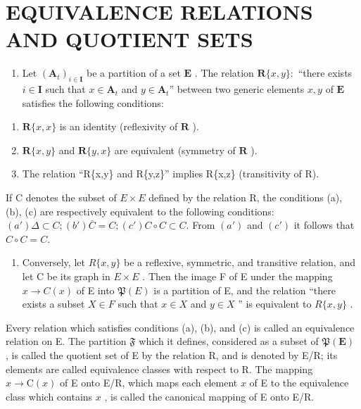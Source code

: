 \section{EQUIVALENCE RELATIONS AND QUOTIENT SETS}

\begin{enumerate}
\def\labelenumi{\arabic{enumi}.}
\tightlist
\item
  Let \((\mathbf{A}_t)_{i \in \mathbf{I}}\) be a partition of a set \(\mathbf{E}\) . The relation \(\mathbf{R}\{x, y\} :\) ``there exists \(i \in \mathbf{I}\) such that \(x \in \mathbf{A}_t\) and \(y \in \mathbf{A}_t\)'' between two generic elements \(x, y\) of \(\mathbf{E}\) satisfies the following conditions:
\end{enumerate}

\begin{enumerate}
\def\labelenumi{(\alph{enumi})}
\item
  \(\mathbf{R}\{x,x\}\) is an identity (reflexivity of \(\mathbf{R}\) ).
\item
  \(\mathbf{R}\{x,y\}\) and \(\mathbf{R}\{y,x\}\) are equivalent (symmetry of \(\mathbf{R}\) ).
\item
  The relation ``R\{x,y\} and R\{y,z\}'' implies R\{x,z\} (transitivity of R).
\end{enumerate}

If C denotes the subset of \(E \times E\) defined by the relation R, the conditions (a), (b), (c) are respectively equivalent to the following conditions: \((a') \Delta \subset C; (b') \overline{C} = C; (c') C \circ C \subset C.\) From \((a')\) and \((c')\) it follows that \(C \circ C = C.\)

\begin{enumerate}
\def\labelenumi{\arabic{enumi}.}
\setcounter{enumi}{1}
\tightlist
\item
  Conversely, let \(R\{x,y\}\) be a reflexive, symmetric, and transitive relation, and let C be its graph in \(E \times E\) . Then the image F of E under the mapping \(x \to C(x)\) of E into \(\mathfrak{P}(E)\) is a partition of E, and the relation ``there exists a subset \(X \in F\) such that \(x \in X\) and \(y \in X\) '' is equivalent to \(R\{x, y\}\) .
\end{enumerate}

Every relation which satisfies conditions (a), (b), and (c) is called an equivalence relation on E. The partition \(\mathfrak{F}\) which it defines, considered as a subset of \(\mathfrak{P}(\mathbf{E})\) , is called the quotient set of E by the relation R, and is denoted by E/R; its elements are called equivalence classes with respect to R. The mapping \(x \to \mathrm{C}(x)\) of E onto E/R, which maps each element \(x\) of E to the equivalence class which contains \(x\) , is called the canonical mapping of E onto E/R.

